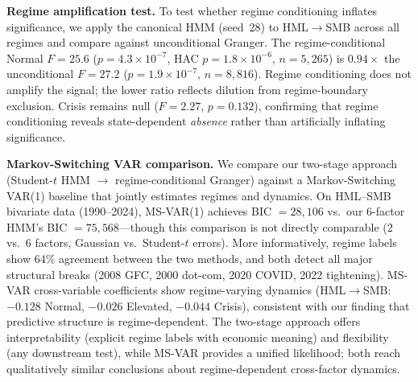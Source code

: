 \documentclass[sigconf,anonymous]{acmart}
\begin{document}
\textbf{Regime amplification test.}
To test whether regime conditioning inflates significance, we apply
the canonical HMM (seed~28) to HML$\to$SMB across all regimes and
compare against unconditional Granger. The regime-conditional Normal
$F = 25.6$ ($p = 4.3 \times 10^{-7}$, HAC $p = 1.8 \times 10^{-6}$,
$n = 5{,}265$) is $0.94\times$ the unconditional $F = 27.2$
($p = 1.9 \times 10^{-7}$, $n = 8{,}816$). Regime conditioning does
not amplify the signal; the lower ratio reflects dilution from
regime-boundary exclusion. Crisis remains null ($F = 2.27$, $p = 0.132$),
confirming that regime conditioning reveals state-dependent \emph{absence}
rather than artificially inflating significance.

\textbf{Markov-Switching VAR comparison.}
We compare our two-stage approach (Student-$t$ HMM $\to$ regime-conditional
Granger) against a Markov-Switching VAR(1) baseline that jointly estimates
regimes and dynamics. On HML--SMB bivariate data (1990--2024), MS-VAR(1)
achieves BIC $= 28{,}106$ vs.\ our 6-factor HMM's BIC $= 75{,}568$---though
this comparison is not directly comparable (2 vs.\ 6 factors, Gaussian
vs.\ Student-$t$ errors). More informatively, regime labels show 64\%
agreement between the two methods, and both detect all major structural
breaks (2008 GFC, 2000 dot-com, 2020 COVID, 2022 tightening).
MS-VAR cross-variable coefficients show regime-varying dynamics
(HML$\to$SMB: $-0.128$ Normal, $-0.026$ Elevated, $-0.044$ Crisis),
consistent with our finding that predictive structure is regime-dependent.
The two-stage approach offers interpretability (explicit regime labels
with economic meaning) and flexibility (any downstream test), while
MS-VAR provides a unified likelihood; both reach qualitatively similar
conclusions about regime-dependent cross-factor dynamics.
\end{document}

